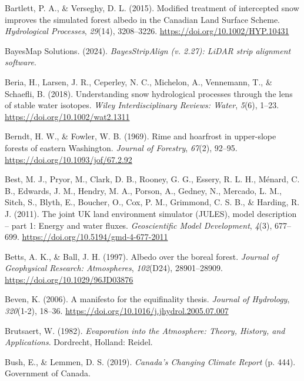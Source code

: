 \documentclass[
  letterpaper,
]{tex/uofsthesis-cs}
\newlength{\cslhangindent}
\newenvironment{CSLReferences}[2] %
 {\begin{list}{}{%
  \setlength{\itemindent}{0pt}
  \setlength{\leftmargin}{0pt}
  \setlength{\parsep}{0pt}
  \ifodd #1
   \setlength{\leftmargin}{\cslhangindent}
   \setlength{\itemindent}{-1\cslhangindent}
  \fi
  \setlength{\itemsep}{#2\baselineskip}}}
 {\end{list}}
\begin{document}
\begin{CSLReferences}{1}{0}
Bartlett, P. A., \& Verseghy, D. L. (2015). Modified treatment of
intercepted snow improves the simulated forest albedo in the {Canadian
Land Surface Scheme}. \emph{Hydrological Processes}, \emph{29}(14),
3208--3226. \url{https://doi.org/10.1002/HYP.10431}

BayesMap Solutions. (2024). \emph{{BayesStripAlign} (v. 2.27): {LiDAR}
strip alignment software}.

Beria, H., Larsen, J. R., Ceperley, N. C., Michelon, A., Vennemann, T.,
\& Schaefli, B. (2018). Understanding snow hydrological processes
through the lens of stable water isotopes. \emph{Wiley Interdisciplinary
Reviews: Water}, \emph{5}(6), 1--23.
\url{https://doi.org/10.1002/wat2.1311}

Berndt, H. W., \& Fowler, W. B. (1969). Rime and hoarfrost in
upper-slope forests of eastern {Washington}. \emph{Journal of Forestry},
\emph{67}(2), 92--95. \url{https://doi.org/10.1093/jof/67.2.92}

Best, M. J., Pryor, M., Clark, D. B., Rooney, G. G., Essery, R. L. H.,
Ménard, C. B., Edwards, J. M., Hendry, M. A., Porson, A., Gedney, N.,
Mercado, L. M., Sitch, S., Blyth, E., Boucher, O., Cox, P. M., Grimmond,
C. S. B., \& Harding, R. J. (2011). The joint {UK} land environment
simulator ({JULES}), model description -- part 1: Energy and water
fluxes. \emph{Geoscientific Model Development}, \emph{4}(3), 677--699.
\url{https://doi.org/10.5194/gmd-4-677-2011}

Betts, A. K., \& Ball, J. H. (1997). Albedo over the boreal forest.
\emph{Journal of Geophysical Research: Atmospheres}, \emph{102}(D24),
28901--28909. \url{https://doi.org/10.1029/96JD03876}

Beven, K. (2006). A manifesto for the equifinality thesis. \emph{Journal
of Hydrology}, \emph{320}(1-2), 18--36.
\url{https://doi.org/10.1016/j.jhydrol.2005.07.007}

Brutsaert, W. (1982). \emph{Evaporation into the {Atmosphere}: {Theory},
{History}, and {Applications}}. Dordrecht, Holland: Reidel.

Bush, E., \& Lemmen, D. S. (2019). \emph{Canada's {Changing Climate
Report}} (p. 444). Government of Canada.


\end{CSLReferences}
\end{document}
